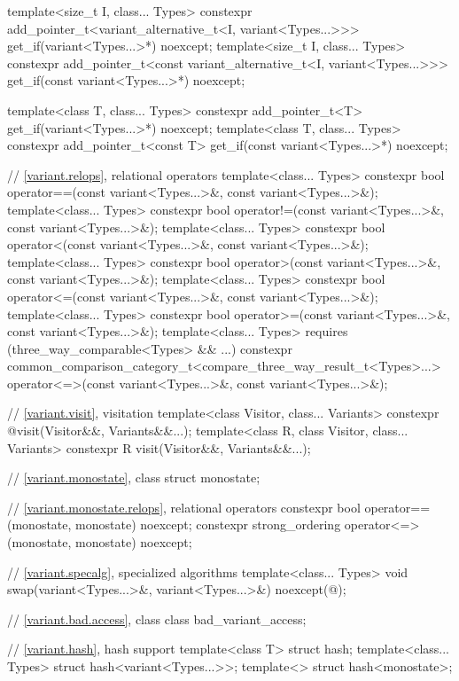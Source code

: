 \begin{codeblock}
{  template<size_t I, class... Types>
    constexpr add_pointer_t<variant_alternative_t<I, variant<Types...>>>
      get_if(variant<Types...>*) noexcept;
  template<size_t I, class... Types>
    constexpr add_pointer_t<const variant_alternative_t<I, variant<Types...>>>
      get_if(const variant<Types...>*) noexcept;

  template<class T, class... Types>
    constexpr add_pointer_t<T>
      get_if(variant<Types...>*) noexcept;
  template<class T, class... Types>
    constexpr add_pointer_t<const T>
      get_if(const variant<Types...>*) noexcept;

  // \ref{variant.relops}, relational operators
  template<class... Types>
    constexpr bool operator==(const variant<Types...>&, const variant<Types...>&);
  template<class... Types>
    constexpr bool operator!=(const variant<Types...>&, const variant<Types...>&);
  template<class... Types>
    constexpr bool operator<(const variant<Types...>&, const variant<Types...>&);
  template<class... Types>
    constexpr bool operator>(const variant<Types...>&, const variant<Types...>&);
  template<class... Types>
    constexpr bool operator<=(const variant<Types...>&, const variant<Types...>&);
  template<class... Types>
    constexpr bool operator>=(const variant<Types...>&, const variant<Types...>&);
  template<class... Types> requires (three_way_comparable<Types> && ...)
    constexpr common_comparison_category_t<compare_three_way_result_t<Types>...>
      operator<=>(const variant<Types...>&, const variant<Types...>&);

  // \ref{variant.visit}, visitation
  template<class Visitor, class... Variants>
    constexpr @\seebelow@ visit(Visitor&&, Variants&&...);
  template<class R, class Visitor, class... Variants>
    constexpr R visit(Visitor&&, Variants&&...);

  // \ref{variant.monostate}, class 
  struct monostate;

  // \ref{variant.monostate.relops},  relational operators
  constexpr bool operator==(monostate, monostate) noexcept;
  constexpr strong_ordering operator<=>(monostate, monostate) noexcept;

  // \ref{variant.specalg}, specialized algorithms
  template<class... Types>
    void swap(variant<Types...>&, variant<Types...>&) noexcept(@\seebelow@);

  // \ref{variant.bad.access}, class 
  class bad_variant_access;

  // \ref{variant.hash}, hash support
  template<class T> struct hash;
  template<class... Types> struct hash<variant<Types...>>;
  template<> struct hash<monostate>;
}
\end{codeblock}

